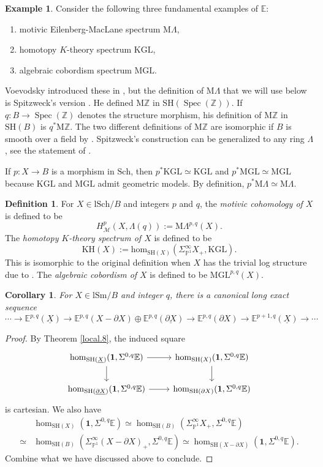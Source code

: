 \documentclass[10pt]{amsart}
\newtheorem{cor}[thm]{Corollary}
\theoremstyle{definition}
\newtheorem{df}[thm]{Definition}
\newtheorem{exm}[thm]{Example}
\theoremstyle{remark}
\numberwithin{equation}{subsection}
\newcommand{\E}{\mathbb{E}}
\renewcommand{\P}{\mathbb{P}}
\newcommand{\Z}{\mathbb{Z}}
\newcommand{\cM}{\mathcal{M}}
\newcommand{\rM}{\mathrm{M}}
\DeclareMathOperator{\Spec}{Spec}
\newcommand{\ul}{\underline}
\newcommand{\SH}{\mathrm{SH}}
\newcommand{\map}{\mathrm{hom}}
\newcommand{\Sch}{\mathrm{Sch}}
\newcommand{\lSch}{\mathrm{lSch}}
\newcommand{\lSm}{\mathrm{lSm}}
\newcommand{\unit}{\mathbf{1}}
\newcommand{\ML}{\mathrm{M}\Lambda}
\newcommand{\MGL}{\mathrm{MGL}}
\newcommand{\KGL}{\mathrm{KGL}}
\begin{document}
\begin{exm}
\label{coh.1}
Consider the following three fundamental examples of $\E$:
\begin{enumerate}
\item[(i)] motivic Eilenberg-MacLane spectrum $\ML$,
\item[(ii)] homotopy $K$-theory spectrum $\KGL$,
\item[(iii)] algebraic cobordism spectrum $\MGL$.
\end{enumerate}
Voevodsky introduced these in \cite[\S 6]{zbMATH01194164}, but the definition of $\ML$ that we will use below is Spitzweck's version \cite[Definition 4.27]{zbMATH07015021}.
He defined $\rM\Z$ in $\SH(\Spec(\Z))$.
If $q\colon B\to \Spec(\Z)$ denotes the structure morphism, his definition of $\rM\Z$ in $\SH(B)$ is $q^*\rM\Z$.
The two different definitions of $\rM\Z$ are isomorphic if $B$ is smooth over a field by \cite[Theorem 8.22]{zbMATH07015021}.
Spitzweck's construction can be generalized to any ring $\Lambda$, see the statement of \cite[Corollary 10.4]{zbMATH07015021}.

If $p\colon X\to B$ is a morphism in $\Sch$, then $p^*\KGL\simeq \KGL$ and $p^*\MGL\simeq \MGL$ because $\KGL$ and $\MGL$ admit geometric models.
By definition, $p^* \ML \simeq \ML$.
\end{exm}

\begin{df}
\label{coh.2}
For $X\in \lSch/B$ and integers $p$ and $q$,
the \emph{motivic cohomology of $X$} is defined to be
\[
H_{\cM}^p(X,\Lambda(q))
:=
\ML^{p,q}(X).
\]
The \emph{homotopy $K$-theory spectrum of $X$} is defined to be
\[
\mathrm{KH}(X)
:=
\map_{\SH(X)}(\Sigma_{\P^1}^\infty X_+,\KGL).
\]
This is isomorphic to the original definition when $X$ has the trivial log structure due to \cite{zbMATH06156613}.
The \emph{algebraic cobordism of $X$} is defined to be $\MGL^{p,q}(X)$.
\end{df}


\begin{cor}
\label{coh.3}
For $X\in \lSm/B$ and integer $q$, there is a canonical long exact sequence
\[
\cdots
\to
\E^{p,q}(\ul{X})
\to
\E^{p,q}(X-\partial X)
\oplus
\E^{p,q}(\ul{\partial X})
\to
\E^{p,q}(\partial X)
\to
\E^{p+1,q}(\ul{X})
\to
\cdots
\]
\end{cor}
\begin{proof}
By Theorem \ref{local.8},
the induced square
\[
\begin{tikzcd}
\hom_{\SH(\ul{X})}(\unit,\Sigma^{0,q}\E)\ar[d]\ar[r]&
\hom_{\SH(X)}(\unit,\Sigma^{0,q}\E)\ar[d]
\\
\hom_{\SH(\ul{\partial X})}(\unit,\Sigma^{0,q}\E)\ar[r]&
\hom_{\SH(\partial X)}(\unit,\Sigma^{0,q}\E)
\end{tikzcd}
\]
is cartesian.
We also have
\begin{align*}
&
\hom_{\SH(X)}
(\unit,\Sigma^{0,q}\E)
\simeq
\hom_{\SH(B)}
(\Sigma_{\P^1}^\infty X_+,\Sigma^{0,q}\E)
\\
\simeq &
\hom_{\SH(B)}
(\Sigma_{\P^1}^\infty (X-\partial X)_+,\Sigma^{0,q}\E)
\simeq
\hom_{\SH(X-\partial X)}
(\unit,\Sigma^{0,q}\E).
\end{align*}
Combine what we have discussed above to conclude.
\end{proof}
\end{document}
